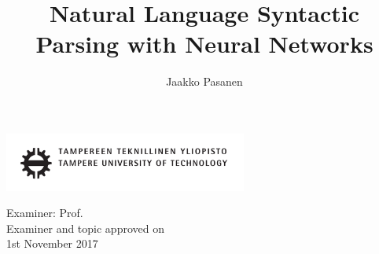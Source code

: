 \documentclass[12pt,a4paper,english
]{tutthesis}
\author{Jaakko Pasanen}
\title{Natural Language Syntactic Parsing with Neural Networks} %
\begin{document}
\makeatletter

%
\thispagestyle{empty}
\vspace*{-.5cm}\noindent
\includegraphics[width=8cm]{tty_tut_logo}   %

\vspace{6.8cm}
\maketitle
\vspace{6.7cm} %

\begin{flushright}  
  \begin{minipage}[c]{6.8cm}
    \begin{spacing}{1.0}
      \textsf{Examiner: Prof. \@examiner}\\
      \textsf{Examiner and topic approved on}\\ 
      \textsf{1st November 2017}\\
    \end{spacing}
  \end{minipage}
\end{flushright}

\if@twoside
\clearpage
\fi

%
\setcounter{page}{0} %

\end{document}
